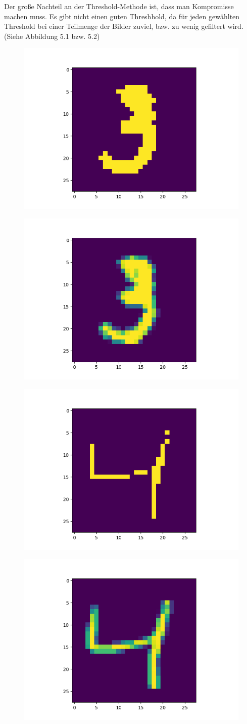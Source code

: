 Der große Nachteil an der Threshold-Methode ist, dass man Kompromisse machen muss. Es gibt nicht einen guten Threshhold, da für jeden gewählten Threshold bei einer Teilmenge der Bilder zuviel, bzw. zu wenig gefiltert wird. (Siehe Abbildung 5.1 bzw. 5.2)
\begin{figure}[h]
\centering
\begin{minipage}{.5\textwidth}
  \centering
  \includegraphics[width=.4\linewidth]{./bilder/comparison/threshold/100_3}
  \label{fig:bin3}
\end{minipage}%
\begin{minipage}{.5\textwidth}
  \centering
  \includegraphics[width=.4\linewidth]{./bilder/comparison/default_3}
  \label{fig:dflt}
\end{minipage}
\begin{minipage}{.5\textwidth}
  \centering
  \includegraphics[width=.4\linewidth]{./bilder/comparison/threshold/200}
  \label{fig:bin4}
\end{minipage}%
\begin{minipage}{.5\textwidth}
  \centering
  \includegraphics[width=.4\linewidth]{./bilder/comparison/default}
  \label{fig:dflt}
\end{minipage}

\end{figure}
